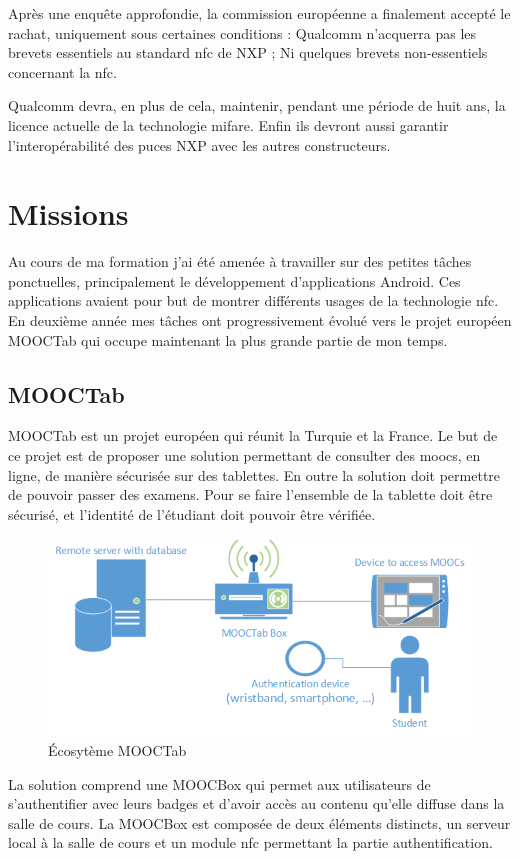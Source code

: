 \documentclass[french,12pt,a4paper,titlepage,openright,openbib]{report}
\begin{document}
Après une enquête approfondie, la commission européenne a finalement accepté le rachat, uniquement sous certaines conditions :
Qualcomm n'acquerra pas les brevets essentiels au standard \gls{nfc} de NXP ; Ni quelques brevets non-essentiels concernant la \gls{nfc}.

Qualcomm devra, en plus de cela, maintenir, pendant une période de huit ans, la licence actuelle de la technologie \gls{mifare}. Enfin ils devront aussi garantir l'interopérabilité des puces NXP avec les autres constructeurs.

\chapter{Missions}
Au cours de ma formation j'ai été amenée à travailler sur des petites tâches ponctuelles, principalement le développement d'applications Android. Ces applications avaient pour but de montrer différents usages de la technologie \gls{nfc}.
En deuxième année mes tâches ont progressivement évolué vers le projet européen MOOCTab qui occupe maintenant la plus grande partie de mon temps.

\section{MOOCTab}
MOOCTab est un projet européen qui réunit la Turquie et la France. Le but de ce projet est de proposer une solution permettant de consulter des \glspl{mooc}, en ligne, de manière sécurisée sur des tablettes. En outre la solution doit permettre de pouvoir passer des examens. Pour se faire l'ensemble de la tablette doit être sécurisé, et l'identité de l'étudiant doit pouvoir être vérifiée.
\begin{figure}
	\center
	\includegraphics[]{ecosystem_mooctab}
	\caption{Écosytème MOOCTab}
\end{figure}

La solution comprend une MOOCBox qui permet aux utilisateurs de s'authentifier avec leurs badges et d'avoir accès au contenu qu'elle diffuse dans la salle de cours.
La MOOCBox est composée de deux éléments distincts, un serveur local à la salle de cours et un module \gls{nfc} permettant la partie authentification.
\end{document}
